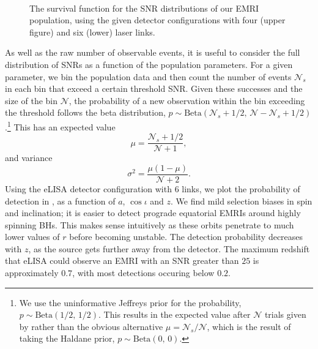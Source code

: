 \begin{figure}[htbp]
\centering
{}\\
\caption{\label{fig:EMRI-SNRs}The survival function for the SNR distributions of our EMRI population, using the given detector configurations with four (upper figure) and six (lower) laser links.}
\end{figure}

As well as the raw number of observable events, it is useful to consider the full distribution of SNRs as a function of the population parameters. For a given parameter, we bin the population data and then count the number of events $\mathcal{N}_s$ in each bin that exceed a certain threshold SNR. Given these successes and the size of the bin $\mathcal{N}$, the probability of a new observation within the bin exceeding the threshold follows the beta distribution, $p \sim \mathrm{Beta}\left(\mathcal{N}_s + 1/2, \, \mathcal{N} - \mathcal{N}_s + 1/2\right)$.\footnote{We use the uninformative Jeffreys prior for the probability, $p \sim \mathrm{Beta}\left(1/2,\,1/2\right)$. This results in the expected value after $\mathcal{N}$ trials given by  rather than the obvious alternative $\mu = \mathcal{N}_s/\mathcal{N}$, which is the result of taking the Haldane prior, $p \sim \mathrm{Beta}\left(0,\,0\right)$.} This has an expected value
\begin{equation}
\label{eq:EMRI-beta-mean}
\mu = \frac{\mathcal{N}_s + 1/2}{\mathcal{N} + 1},
\end{equation}
and variance
\begin{equation}
\sigma^2 = \frac{\mu\left(1-\mu\right)}{\mathcal{N} + 2}.
\end{equation}
Using the eLISA detector configuration with $6$ links, we plot the probability of detection in , as a function of $a$, $\cos\iota$ and $z$. We find mild selection biases in spin and inclination; it is easier to detect prograde equatorial EMRIs around highly spinning BHs. This makes sense intuitively as these orbits penetrate to much lower values of $r$ before becoming unstable. The detection probability decreases with $z$, as the source gets further away from the detector. The maximum redshift that eLISA could observe an EMRI with an SNR greater than $25$ is approximately $0.7$, with most detections occuring below $0.2$.

